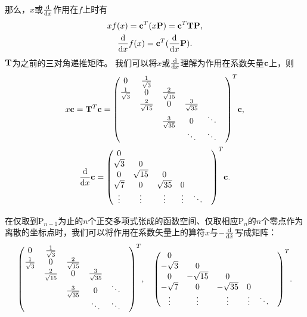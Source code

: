 \documentclass[a4paper,unicode]{report}
\begin{document}
那么，$x$或$\dv{x}$作用在$f$上时有
\begin{gather}
    xf(x) = \vb{c}^T (x\vb{P}) = \vb{c}^T \vb{T} \vb{P},\\
    \dv{x}f(x) = \vb{c}^T (\dv{x}\vb{P}).
\end{gather}
$\vb{T}$为之前的三对角递推矩阵。
我们可以将$x$或$\dv{x}$理解为作用在系数矢量$\vb{c}$上，则
\begin{gather}
    x\vb{c} = \vb{T}^T\vb{c} = \mqty(
        0&    \frac{1}{\sqrt{3}}&&&&\\
        \frac{1}{\sqrt{3}}& 0&  \frac{2}{\sqrt{15}}&&&\\
        &   \frac{2}{\sqrt{15}}&   0&\frac{3}{\sqrt{35}}&&\\
        &   &   \frac{3}{\sqrt{35}}&    0&\ddots&\\
        &&& \ddots&\ddots&
    )^T\vb{c},\\
    \dv{x}\vb{c} = \mqty(
        0&    &&&&\\
        \sqrt{3}& 0&&&&\\
        0&   \sqrt{15}&   0&&&\\
        \sqrt{7}& 0 &   \sqrt{35}&    0&&\\
        \vdots&\vdots&\vdots& \vdots&\ddots&
    )^T \vb{c}.
\end{gather}

在仅取到$\mathrm{P}_{n-1}$为止的$n$个正交多项式张成的函数空间、仅取相应$\mathrm{P}_{n}$的$n$个零点作为离散的坐标点时，我们可以将作用在系数矢量上的算符$\hat{x}$与$-\dv{\hat{x}}$写成矩阵：
\begin{equation}
    \mqty(
        0&    \frac{1}{\sqrt{3}}&&&&\\
        \frac{1}{\sqrt{3}}& 0&  \frac{2}{\sqrt{15}}&&&\\
        &   \frac{2}{\sqrt{15}}&   0&\frac{3}{\sqrt{35}}&&\\
        &   &   \frac{3}{\sqrt{35}}&    0&\ddots&\\
        &&& \ddots&\ddots&
    )^T,\quad \mqty(
        0&    &&&&\\
        -\sqrt{3}& 0&&&&\\
        0&   -\sqrt{15}&   0&&&\\
        -\sqrt{7}& 0 &   -\sqrt{35}&    0&&\\
        \vdots&\vdots&\vdots& \vdots&\ddots&
        )^T.
\end{equation}
\end{document}
